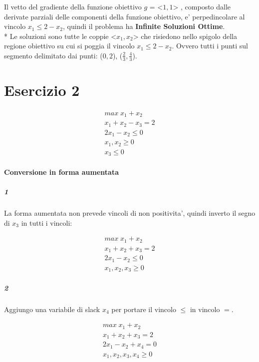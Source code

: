 \documentclass[a4paper,12pt,oneside]{article}
\begin{document}
    Il vetto del gradiente della funzione obiettivo $g$ = <$1, 1$> , composto dalle derivate parziali delle componenti della funzione obiettivo, e' perpedincolare al vincolo $x_1 \leq 2 - x_2$, quindi il problema ha \textbf{Infinite Soluzioni Ottime}. \\*
    Le soluzioni sono tutte le coppie <$x_1, x_2$> che risiedono nello spigolo della regione obiettivo su cui si poggia il vincolo $x_1 \leq 2 - x_2$. Ovvero tutti i punti sul segmento delimitato dai punti: ($0, 2$),  ($\frac 2 3, \frac 4 3$).

    \section{Esercizio 2}

    \begin{align}
        \text{$max \; x_1 + x_2$} \\
        \text{$x_1 + x_2 - x_3 = 2$} \\
        \text{$2 x_1 - x_2 \leq 0$} \\
        \text{$x_1, x_2 \geq 0$} \\
        \text{$x_3 \leq 0$}
    \end{align}

    \paragraph{Conversione in forma aumentata}

    \subparagraph{1}

    La forma aumentata non prevede vincoli di non positivita', quindi inverto il segno di $x_3$ in tutti i vincoli:

    \begin{align}
        \text{$max \; x_1 + x_2$} \\
        \text{$x_1 + x_2 + x_3 = 2$} \\
        \text{$2 x_1 - x_2 \leq 0$} \\
        \text{$x_1, x_2, x_3 \geq 0$}
    \end{align}

    \subparagraph{2}

    Aggiungo una variabile di slack $x_4$ per portare il vincolo $\leq$ in vincolo $=$.

    \begin{align}
        \text{$max \; x_1 + x_2$} \\
        \text{$x_1 + x_2 + x_3 = 2$} \\
        \text{$2 x_1 - x_2 + x_4 = 0$} \\
        \text{$x_1, x_2, x_3, x_4 \geq 0$}
    \end{align}
\end{document}

